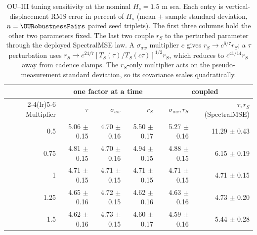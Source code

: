 
\begin{table}[t]
  \centering
  \caption{OU--III tuning sensitivity at the nominal $H_s=1.5$ m sea. Each entry is vertical-displacement RMS error in percent of $H_s$ (mean $\pm$ sample standard deviation, $n=\OURobustnessPairs$ paired seed triplets). The first three columns hold the other two parameters fixed. The last two couple $r_S$ to the perturbed parameter through the deployed SpectralMSE law. A $\sigma_{aw}$ multiplier $c$ gives $r_S\to c^{6/7}r_S$; a $\tau$ perturbation uses $r_S\to c^{24/7}[T_S(\tau)/T_S(c\tau)]^{1/2}r_S$, which reduces to $c^{41/14}r_S$ away from cadence clamps. The $r_S$-only multiplier acts on the pseudo-measurement standard deviation, so its covariance scales quadratically.}
  \label{tab:ou_robustness_sensitivity}
  \footnotesize
  \setlength{\tabcolsep}{7pt}
  \begin{tabular}{@{}rrrrrr@{}}
    \toprule
    & \multicolumn{3}{c}{one factor at a time} & \multicolumn{2}{c}{coupled} \\
    \cmidrule(lr){2-4}\cmidrule(lr){5-6}
    Multiplier & $\tau$ & $\sigma_{aw}$ & $r_S$ & $\sigma_{aw},r_S$ & $\tau,r_S$ (SpectralMSE) \\
    \midrule
    0.5 & 5.06 $\pm$ 0.15 & 4.70 $\pm$ 0.16 & 5.50 $\pm$ 0.17 & 5.27 $\pm$ 0.16 & 11.29 $\pm$ 0.43 \\
    0.75 & 4.81 $\pm$ 0.15 & 4.70 $\pm$ 0.16 & 4.94 $\pm$ 0.15 & 4.88 $\pm$ 0.15 & 6.15 $\pm$ 0.19 \\
    1 & 4.71 $\pm$ 0.15 & 4.71 $\pm$ 0.15 & 4.71 $\pm$ 0.15 & 4.71 $\pm$ 0.15 & 4.71 $\pm$ 0.15 \\
    1.25 & 4.65 $\pm$ 0.16 & 4.72 $\pm$ 0.15 & 4.62 $\pm$ 0.16 & 4.63 $\pm$ 0.16 & 4.73 $\pm$ 0.20 \\
    1.5 & 4.62 $\pm$ 0.16 & 4.73 $\pm$ 0.15 & 4.60 $\pm$ 0.17 & 4.59 $\pm$ 0.16 & 5.44 $\pm$ 0.28 \\
    \bottomrule
  \end{tabular}
\end{table}

